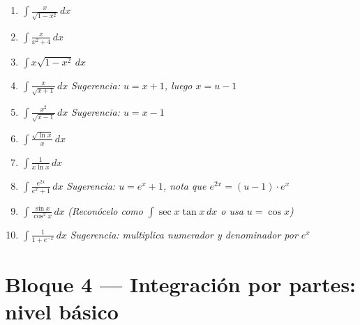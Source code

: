 \documentclass[12pt, letterpaper]{article}
\newcommand{\dx}{\,dx}
\begin{document}
\vspace{4pt}

\begin{enumerate}[label=\textbf{\arabic*.}, leftmargin=*, itemsep=14pt, start=37]

  \item \medio\quad
    $\displaystyle\int \frac{x}{\sqrt{1-x^2}}\dx$

  \item \medio\quad
    $\displaystyle\int \frac{x}{x^2+4}\dx$

  \item \medio\quad
    $\displaystyle\int x\sqrt{1-x^2}\dx$

  \item \dificil\quad
    $\displaystyle\int \frac{x}{\sqrt{x+1}}\dx$
    \qquad\textit{Sugerencia: $u = x+1$, luego $x = u-1$}

  \item \dificil\quad
    $\displaystyle\int \frac{x^2}{\sqrt{x-1}}\dx$
    \qquad\textit{Sugerencia: $u = x-1$}

  \item \dificil\quad
    $\displaystyle\int \frac{\sqrt{\ln x}}{x}\dx$

  \item \dificil\quad
    $\displaystyle\int \frac{1}{x\ln x}\dx$

  \item \dificil\quad
    $\displaystyle\int \frac{e^{2x}}{e^x+1}\dx$
    \qquad\textit{Sugerencia: $u = e^x + 1$, nota que $e^{2x} = (u-1)\cdot e^x$}

  \item \dificil\quad
    $\displaystyle\int \frac{\sin x}{\cos^2 x}\dx$
    \qquad\textit{(Reconócelo como $\int \sec x\tan x\dx$ o usa $u = \cos x$)}

  \item \dificil\quad
    $\displaystyle\int \frac{1}{1+e^{-x}}\dx$
    \qquad\textit{Sugerencia: multiplica numerador y denominador por $e^x$}

\end{enumerate}

\vspace{4pt}

\section{Bloque 4 — Integración por partes: nivel básico}
\end{document}

